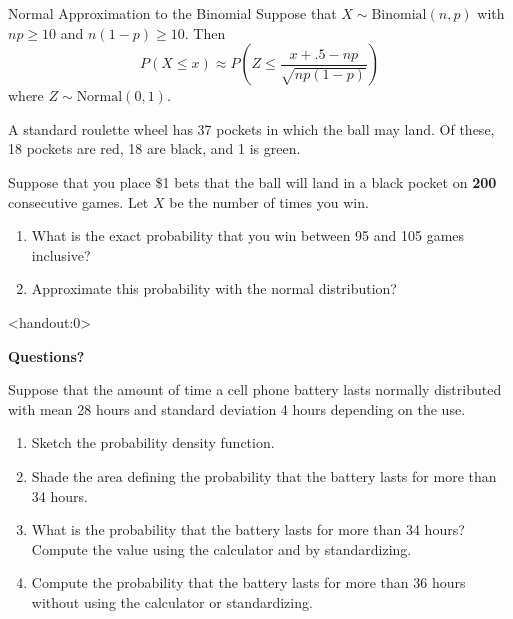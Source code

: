 \begin{frame}

  \begin{block}{Normal Approximation to the Binomial}
    Suppose that $X \sim \mbox{Binomial}(n,p)$ with $np \geq 10$ and $n(1-p) \geq 10$. Then
    \[
      P(X \leq x) \approx
      P\left(Z \leq \frac{x + .5 - np}{\sqrt{np(1-p)}}\right)
    \]
    where $Z \sim \mbox{Normal}(0,1)$. 
  \end{block}
\end{frame}

\begin{frame}

  \begin{block}{\example}
     A standard roulette wheel has 37 pockets in which the ball may land. Of these, 18 pockets are red, 18 are black, and 1 is green.

    \bigskip
    
    Suppose that you place \$1 bets that the ball will land in a black pocket on \textbf{200} consecutive games. Let $X$ be the number of times you win.

    \begin{enumerate}[label=\alph*),start=1]
    \item What is the exact probability that you win between 95 and 105 games inclusive?
    \item Approximate this probability with the normal distribution?
    \end{enumerate}
  \end{block}
\end{frame}

\begin{frame}<handout:0>
  \begin{center}
    \Huge{\textbf{Questions?}}
  \end{center}
\end{frame}

\begin{frame}

\begin{block}{\exercise}

Suppose that the amount of time a cell phone battery lasts normally distributed with mean 28 hours and standard deviation 4 hours depending on the use.

\begin{enumerate}[label=\alph*),start=1]
\item Sketch the probability density function.
\item Shade the area defining the probability that the battery lasts for more than 34 hours. 
\item What is the probability that the battery lasts for more than 34 hours? Compute the value using the calculator and by standardizing.
\item Compute the probability that the battery lasts for more than 36 hours without using the calculator or standardizing.
\end{enumerate}
\end{block}
\end{frame}

